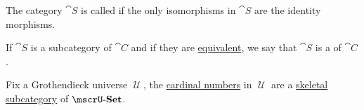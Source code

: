 \begin{definition}\label{def:skeletal_category}
  The category \( \cat{S} \) is called  if the only isomorphisms in \( \cat{S} \) are the identity morphisms.

  If \( \cat{S} \) is a subcategory of \( \cat{C} \) and if they are \hyperref[def:category_equivalence]{equivalent}, we say that \( \cat{S} \) is a  of \( \cat{C} \).
\end{definition}

\begin{example}\label{ex:skeleton_of_set}
  Fix a Grothendieck universe \( \mscrU \), the \hyperref[def:cardinal]{cardinal numbers} in \( \mscrU \) are a \hyperref[def:skeletal_category]{skeletal subcategory} of \( \ucat{Set} \).
\end{example}

